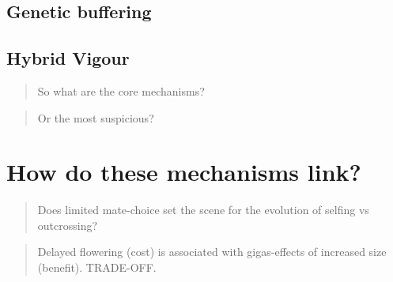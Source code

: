\documentclass[openany, 12pt, draft]{book}
\begin{document}
\subsection{Genetic buffering}\label{buffering}

\subsection{Hybrid Vigour}\label{vigour}

\begin{quote}
So what are the core mechanisms?
\end{quote}

\begin{quote}
Or the most suspicious?
\end{quote}

\section{How do these mechanisms
link?}\label{how-do-these-mechanisms-link}

\begin{quote}
Does limited mate-choice set the scene for the evolution of selfing vs
outcrossing?
\end{quote}

\begin{quote}
Delayed flowering (cost) is associated with gigas-effects of increased
size (benefit). TRADE-OFF.
\end{quote}


\end{document}
